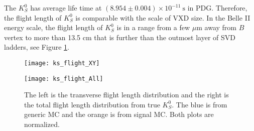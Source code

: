  The $K_S^0$ has average life time at $(8.954 \pm 0.004) \times 10 ^{-11} \:\text{s}$ in PDG. Therefore, the flight length of $K_S^0$ is comparable with the scale of VXD size. In the Belle II energy scale, the flight length of $K_S^0$ is in a range from a few $\mu$m away from $B$ vertex to more than 13.5 cm that is further than the outmost layer of SVD ladders, see Figure \ref{fig:ks_flight}.

 \begin{figure}[htpb]
 	\centering 
 	\begin{minipage}[t]{0.45\linewidth}
 	\texttt{[image: ks\_flight\_XY]}
 	\end{minipage}
	\begin{minipage}[t]{0.45\linewidth}
		\texttt{[image: ks\_flight\_All]}
	\end{minipage}
 	\caption{The left is the transverse flight length distribution and the right is the total flight length distribution from true $K_S^0$.  The blue is from generic MC and  the orange is from signal MC. Both plots are normalized.}
 	\label{fig:ks_flight}
 \end{figure}
 
